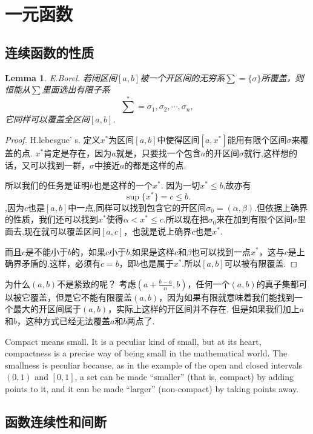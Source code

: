 \documentclass{article}
\newtheorem{lemma}[theorem]{Lemma}
\begin{document}
\newpage
\section{一元函数}
\subsection{连续函数的性质}

\begin{lemma}
\rm E.Borel. 若闭区间$[a,b]$被一个开区间的无穷系$\sum = \{\sigma\}$所覆盖，则恒能从$\sum$里面选出有限子系\[\sum^{*} = {\sigma_1,\sigma_2,\cdots,\sigma_n},\]它同样可以覆盖全区间$[a,b]$.
\end{lemma}

\begin{proof}
\rm H.lebesgue' s. 定义$x^*$为区间$[a,b]$中使得区间$[a,x^*]$能用有限个区间$\sigma$来覆盖的点. $x^*$肯定是存在，因为$a$就是，只要找一个包含$a$的开区间$\sigma$就行,这样想的话，又可以找到一群，$\sigma$中接近$a$的都是这样的点.

所以我们的任务是证明$b$也是这样的一个$x^*$.
因为一切$x^* \leq b$,故亦有\[\sup\{x^*\}=c \leq b.\],因为$c$也是$[a,b]$中一点,同样可以找到包含它的开区间$\sigma_0=(\alpha,\beta)$.但依据上确界的性质，我们还可以找到$x^*$使得$\alpha < x^* \leq c$.所以现在把$\sigma_0$来在加到有限个区间$\sigma$里面去,现在就可以覆盖区间$[a,c]$，也就是说上确界$c$也是$x^*$.

而且$c$是不能小于$b$的，如果$c$小于$b$,如果是这样$c$和$\beta$也可以找到一点$x^*$，这与$c$是上确界矛盾的.这样，必须有$c=b$，即$b$也是属于$x^*$.所以$[a,b]$可以被有限覆盖.
\end{proof}


为什么$(a,b)$不是紧致的呢？ 考虑$(a+\frac{b-a}{n},b)$，任何一个$(a,b)$的真子集都可以被它覆盖，但是它不能有限覆盖$(a,b)$，因为如果有限就意味着我们能找到一个最大的开区间属于$(a,b)$，实际上这样的开区间并不存在. 但是如果我们加上$a$和$b$，这种方式已经无法覆盖$a$和$b$两点了.

Compact means small. It is a peculiar kind of small, but at its heart, compactness is a precise way of being small in the mathematical world. The smallness is peculiar because, as in the example of the open and closed intervals $(0,1)$ and $[0,1]$, a set can be made “smaller” (that is, compact) by adding points to it, and it can be made “larger” (non-compact) by taking points away.

\newpage
\subsection{函数连续性和间断}
\end{document}
